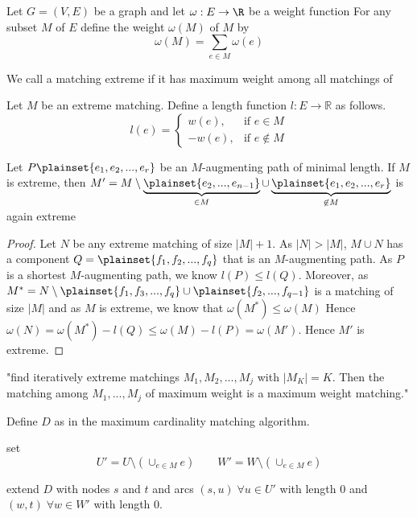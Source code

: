 Let $G=(V,E)$ be a graph and let $\omega: E \rightarrow \R$ be a weight function
For any subset $M$ of $E$ define the weight $\omega(M)$ of $M$ by \[
	\omega(M) = \sum\limits_{e \in M}\omega(e)
\]

\begin{defn+}
	We call a matching extreme if it has maximum weight among all matchings of 

	Let $M$ be an extreme matching. Define a length function $l: E \rightarrow \mathbb{R}$ as follows.
	\[
		l(e) =
		\begin{cases}
			w(e), & \text{if } e\in M \\
			-w(e), & \text{if } e \not \in M
		\end{cases}
	\]	
\end{defn+}

\begin{lem}
	Let $P \plainset{e_1, e_2, ..., e_r}$ be an $M$-augmenting path of minimal length.
	If $M$ is extreme, then $M' = M \setminus \underbrace{\plainset{e_2, ..., e_{n-1}}}_{\in M} \cup \underbrace{\plainset{e_1, e_2, ..., e_r}}_{\not \in M}$ is again extreme
\end{lem}

\begin{proof}
	Let $N$ be any extreme matching of size $|M| + 1$. As $|N| > |M|$, $M \cup N$
	has a component $Q = \plainset{f_1, f_2, ..., f_q}$ that is an $M$-augmenting path.
	As $P$ is a shortest $M$-augmenting path, we know $l(P) \leq l(Q)$. Moreover,
	as $M^*=N\setminus \plainset{f_1, f_3, ..., f_q} \cup \plainset{f_2, ..., f_{q-1}}$ 
	is a matching of size $|M|$ and as $M$ is extreme, we know that $\omega(M^*) \leq \omega(M)$
	Hence $\omega(N) = \omega(M^*) - l(Q) \leq \omega (M) - l(P) = \omega(M')$.
	Hence $M'$ is extreme.
\end{proof}

"find iteratively extreme matchings $M_1, M_2, ..., M_j$ with $|M_K|=K$. Then the
matching among $M_1, ..., M_j$ of maximum weight is a maximum weight matching."

Define  $D$ as in the maximum cardinality matching algorithm.

set \[U'=U\setminus (\cup_{e\in M}e) \qquad W'=W\setminus ( \cup_{e \in M}e) \]

extend $D$ with nodes $s$ and $t$ and arcs $(s,u) \; \forall u \in U'$ with 
length $0$ and $(w,t) \; \forall w \in W'$ with length $0$.

